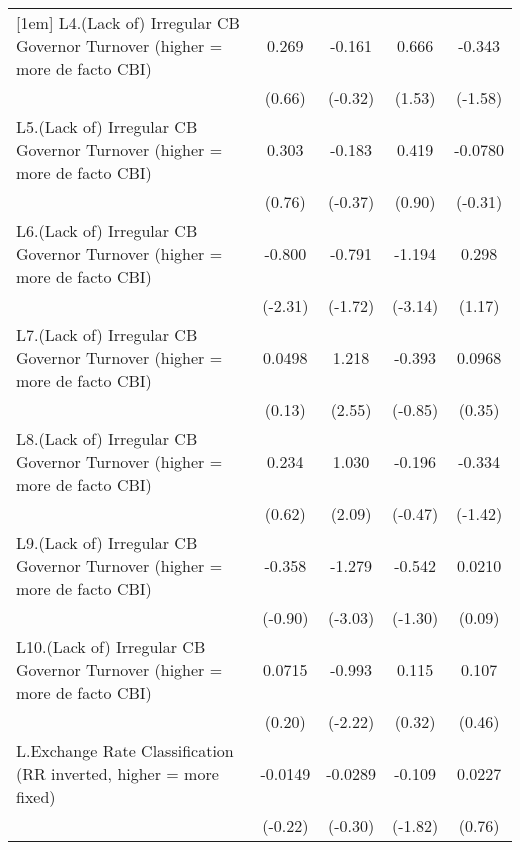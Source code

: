 {\begin{longtable}{l*{4}{c}}
[1em]
L4.(Lack of) Irregular CB Governor Turnover (higher = more de facto CBI)&    0.269         &   -0.161         &    0.666         &   -0.343         \\
                &   (0.66)         &  (-0.32)         &   (1.53)         &  (-1.58)         \\
[1em]
L5.(Lack of) Irregular CB Governor Turnover (higher = more de facto CBI)&    0.303         &   -0.183         &    0.419         &  -0.0780         \\
                &   (0.76)         &  (-0.37)         &   (0.90)         &  (-0.31)         \\
[1em]
L6.(Lack of) Irregular CB Governor Turnover (higher = more de facto CBI)&   -0.800\sym{*}  &   -0.791         &   -1.194\sym{**} &    0.298         \\
                &  (-2.31)         &  (-1.72)         &  (-3.14)         &   (1.17)         \\
[1em]
L7.(Lack of) Irregular CB Governor Turnover (higher = more de facto CBI)&   0.0498         &    1.218\sym{*}  &   -0.393         &   0.0968         \\
                &   (0.13)         &   (2.55)         &  (-0.85)         &   (0.35)         \\
[1em]
L8.(Lack of) Irregular CB Governor Turnover (higher = more de facto CBI)&    0.234         &    1.030\sym{*}  &   -0.196         &   -0.334         \\
                &   (0.62)         &   (2.09)         &  (-0.47)         &  (-1.42)         \\
[1em]
L9.(Lack of) Irregular CB Governor Turnover (higher = more de facto CBI)&   -0.358         &   -1.279\sym{**} &   -0.542         &   0.0210         \\
                &  (-0.90)         &  (-3.03)         &  (-1.30)         &   (0.09)         \\
[1em]
L10.(Lack of) Irregular CB Governor Turnover (higher = more de facto CBI)&   0.0715         &   -0.993\sym{*}  &    0.115         &    0.107         \\
                &   (0.20)         &  (-2.22)         &   (0.32)         &   (0.46)         \\
[1em]
L.Exchange Rate Classification (RR inverted, higher = more fixed)&  -0.0149         &  -0.0289         &   -0.109         &   0.0227         \\
                &  (-0.22)         &  (-0.30)         &  (-1.82)         &   (0.76)         \\

\end{longtable}}
